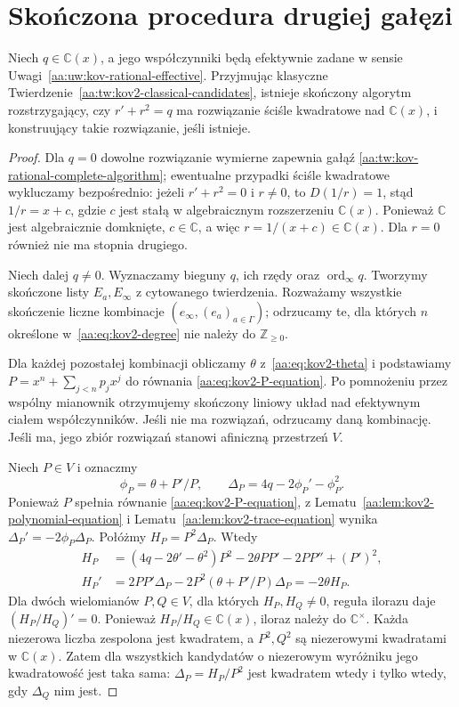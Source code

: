 \section{Skończona procedura drugiej gałęzi}

\begin{twierdzenie}
\label{aa:tw:kov2-algorithm}
Niech $q\in\mathbb C(x)$,
a jego współczynniki
będą efektywnie zadane
w sensie
Uwagi~\ref{aa:uw:kov-rational-effective}.
Przyjmując klasyczne
Twierdzenie~\ref{aa:tw:kov2-classical-candidates},
istnieje skończony algorytm
rozstrzygający, czy
$r'+r^2=q$ ma
rozwiązanie ściśle kwadratowe
nad $\mathbb C(x)$,
i konstruujący takie
rozwiązanie, jeśli istnieje.
\end{twierdzenie}
\begin{proof}
Dla $q=0$ dowolne rozwiązanie
wymierne zapewnia gałąź
\ref{aa:tw:kov-rational-complete-algorithm};
ewentualne przypadki
ściśle kwadratowe
wykluczamy bezpośrednio:
jeżeli $r'+r^2=0$ i $r\ne0$,
to $D(1/r)=1$,
stąd $1/r=x+c$, gdzie
$c$ jest stałą w algebraicznym
rozszerzeniu $\mathbb C(x)$.
Ponieważ $\mathbb C$ jest
algebraicznie domknięte,
$c\in\mathbb C$, a więc
$r=1/(x+c)\in\mathbb C(x)$.
Dla $r=0$ również
nie ma stopnia drugiego.

Niech dalej $q\ne0$.
Wyznaczamy bieguny
$q$, ich rzędy oraz
$\operatorname{ord}_\infty q$.
Tworzymy skończone
listy $E_a,E_\infty$
z cytowanego twierdzenia.
Rozważamy wszystkie
skończenie liczne kombinacje
$(e_\infty,(e_a)_{a\in\Gamma})$;
odrzucamy te, dla których
$n$ określone w~\eqref{aa:eq:kov2-degree}
nie należy do
$\mathbb Z_{\ge0}$.

Dla każdej pozostałej
kombinacji obliczamy $\theta$
z~\eqref{aa:eq:kov2-theta}
i podstawiamy
$P=x^n+\sum_{j<n}p_jx^j$
do równania
\eqref{aa:eq:kov2-P-equation}.
Po pomnożeniu przez wspólny
mianownik otrzymujemy
skończony liniowy układ
nad efektywnym ciałem
współczynników. Jeśli nie
ma rozwiązań, odrzucamy
daną kombinację.
Jeśli ma, jego zbiór
rozwiązań stanowi
afiniczną przestrzeń $V$.

Niech $P\in V$ i oznaczmy
\[
 \phi_P=\theta+P'/P,\qquad
 \Delta_P=4q-2\phi_P'-\phi_P^2.
\]
Ponieważ $P$ spełnia równanie
\eqref{aa:eq:kov2-P-equation}, z
Lematu~\ref{aa:lem:kov2-polynomial-equation}
i Lematu~\ref{aa:lem:kov2-trace-equation}
wynika $\Delta_P'=-2\phi_P\Delta_P$.
Połóżmy $H_P=P^2\Delta_P$. Wtedy
\[
 \begin{aligned}
 H_P&=(4q-2\theta'-\theta^2)P^2
       -2\theta PP'-2PP''+(P')^2,\\
 H_P'&=2PP'\Delta_P-2P^2(\theta+P'/P)\Delta_P
       =-2\theta H_P.
 \end{aligned}
\]
Dla dwóch wielomianów $P,Q\in V$,
dla których $H_P,H_Q\ne0$,
reguła ilorazu daje $(H_P/H_Q)'=0$.
Ponieważ $H_P/H_Q\in\mathbb C(x)$,
iloraz należy do $\mathbb C^\times$.
Każda niezerowa liczba zespolona jest kwadratem,
a $P^2,Q^2$ są niezerowymi kwadratami
w $\mathbb C(x)$.
Zatem dla wszystkich kandydatów o niezerowym
wyróżniku jego kwadratowość jest taka sama:
$\Delta_P=H_P/P^2$ jest kwadratem wtedy
i tylko wtedy, gdy $\Delta_Q$ nim jest.


\end{proof}

